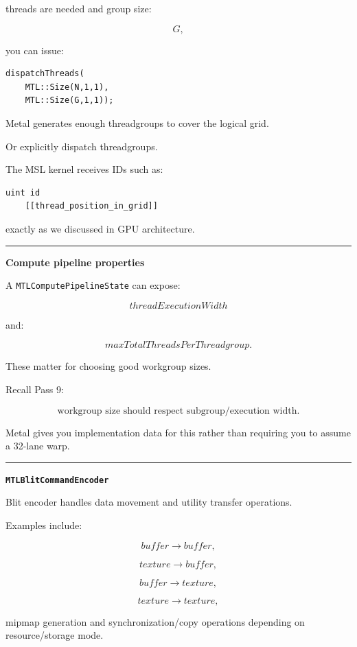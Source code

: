 threads are needed and group size:

\[
G,
\]

you can issue:

\begin{verbatim}
dispatchThreads(
    MTL::Size(N,1,1),
    MTL::Size(G,1,1));
\end{verbatim}

Metal generates enough threadgroups to cover the logical grid.

Or explicitly dispatch threadgroups.

The MSL kernel receives IDs such as:

\begin{verbatim}
uint id
    [[thread_position_in_grid]]
\end{verbatim}

exactly as we discussed in GPU architecture.

\begin{center}\rule{0.5\linewidth}{0.5pt}\end{center}

\textbf{Compute pipeline properties}

A \texttt{MTLComputePipelineState} can expose:

\[
threadExecutionWidth
\]

and:

\[
maxTotalThreadsPerThreadgroup.
\]

These matter for choosing good workgroup sizes.

Recall Pass 9:

\[
\boxed{
\text{workgroup size should respect subgroup/execution width}.
}
\]

Metal gives you implementation data for this rather than requiring you to assume a 32-lane warp.

\begin{center}\rule{0.5\linewidth}{0.5pt}\end{center}

\textbf{\texttt{MTLBlitCommandEncoder}}

Blit encoder handles data movement and utility transfer operations.

Examples include:

\[
buffer\rightarrow buffer,
\]

\[
texture\rightarrow buffer,
\]

\[
buffer\rightarrow texture,
\]

\[
texture\rightarrow texture,
\]

mipmap generation and synchronization/copy operations depending on resource/storage mode.

